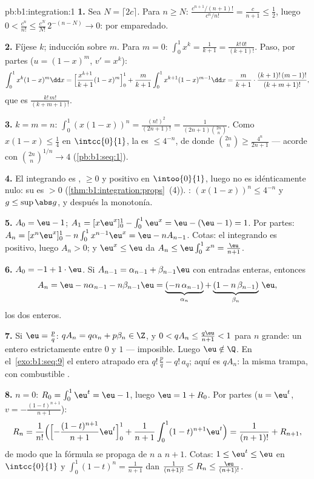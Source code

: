 \begin{solution}{pb:b1:integration:1}
\textbf{1.} Sea $N = \lceil 2c \rceil$. Para $n \geq N$:
$\frac{c^{n+1}/(n+1)!}{c^n/n!} = \frac{c}{n+1} \leq \frac12$, luego
$0 < \frac{c^n}{n!} \leq \frac{c^N}{N!}\,2^{-(n - N)} \to 0$: por
emparedado.

\textbf{2.} Fíjese $k$; inducción sobre $m$. Para $m = 0$:
$\int_0^1 x^k = \frac{1}{k+1} = \frac{k!\,0!}{(k+1)!}$. Paso, por
partes ($u = (1-x)^m$, $v' = x^k$):
\[
\int_0^1 x^k (1-x)^m \dd x
= \Bigl[\frac{x^{k+1}}{k+1}(1-x)^m\Bigr]_0^1
+ \frac{m}{k+1}\int_0^1 x^{k+1}(1-x)^{m-1}\dd x
= \frac{m}{k+1}\cdot\frac{(k+1)!\,(m-1)!}{(k+m+1)!} ,
\]
que es $\frac{k!\,m!}{(k+m+1)!}$.

\textbf{3.} $k = m = n$:
$\int_0^1 (x(1-x))^n = \frac{(n!)^2}{(2n+1)!} =
\frac{1}{(2n+1)\binom{2n}{n}}$. Como $x(1-x) \leq \frac14$ en
$\intcc{0}{1}$, la  es $\leq 4^{-n}$, de donde
$\binom{2n}{n} \geq \frac{4^n}{2n+1}$ --- acorde con
$\binom{2n}{n}^{1/n} \to 4$ (\cref{pb:b1:seq:1}).

\textbf{4.} El integrando es , $\geq 0$ y positivo en
$\intoo{0}{1}$, luego no es idénticamente nulo: su  es $> 0$
(\cref{thm:b1:integration:props}~(4)). :
$(x(1-x))^n \leq 4^{-n}$ y $g \leq \sup\abs g$, y después la
monotonía.

\textbf{5.} $A_0 = \eu - 1$;
$A_1 = [x\eu^x]_0^1 - \int_0^1 \eu^x = \eu - (\eu - 1) = 1$. Por
partes: $A_n = [x^n \eu^x]_0^1 - n\int_0^1 x^{n-1}\eu^x =
\eu - n A_{n-1}$. Cotas: el integrando es positivo, luego $A_n > 0$;
y $\eu^x \leq \eu$ da $A_n \leq \eu\int_0^1 x^n = \frac{\eu}{n+1}$.

\textbf{6.} $A_0 = -1 + 1\cdot\eu$. Si
$A_{n-1} = \alpha_{n-1} + \beta_{n-1}\eu$ con entradas enteras,
entonces
\[
A_n = \eu - n\alpha_{n-1} - n\beta_{n-1}\eu
= \underbrace{(-n\,\alpha_{n-1})}_{\alpha_n}
+ \underbrace{(1 - n\,\beta_{n-1})}_{\beta_n}\,\eu ,
\]
los dos enteros.

\textbf{7.} Si $\eu = \frac pq$: $q A_n = q\alpha_n + p\beta_n
\in \Z$, y $0 < qA_n \leq \frac{q\eu}{n+1} < 1$ para $n$ grande: un
entero estrictamente entre $0$ y $1$ --- imposible. Luego
$\eu \notin \Q$. En el~\cref{exo:b1:seq:9} el entero atrapado era
$q!\,\frac pq - q!\,a_q$; aquí es $qA_n$: la misma trampa, con
combustible .

\textbf{8.} $n = 0$: $R_0 = \int_0^1 \eu^t = \eu - 1$, luego
$\eu = 1 + R_0$. Por partes ($u = \eu^t$, $v = -\frac{(1-t)^{n+1}}{n+1}$):
\[
R_n = \frac{1}{n!}\Bigl(\Bigl[-\frac{(1-t)^{n+1}}{n+1}
\eu^t\Bigr]_0^1 + \frac{1}{n+1}\int_0^1 (1-t)^{n+1}\eu^t\Bigr)
= \frac{1}{(n+1)!} + R_{n+1} ,
\]
de modo que la fórmula se propaga de $n$ a $n + 1$. Cotas:
$1 \leq \eu^t \leq \eu$ en $\intcc{0}{1}$ y
$\int_0^1 (1-t)^n = \frac{1}{n+1}$ dan
$\frac{1}{(n+1)!} \leq R_n \leq \frac{\eu}{(n+1)!}$.


\end{solution}
